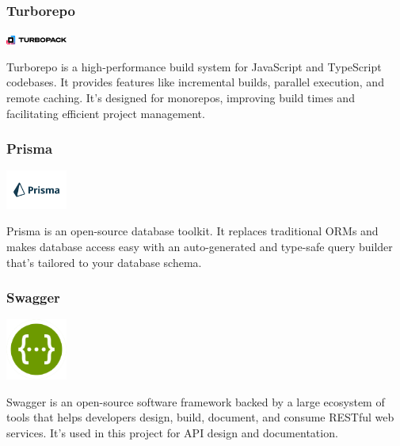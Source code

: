 \subsubsection*{Turborepo}

\begin{center}
\includegraphics[width=0.15\textwidth]{Images/logos/turbopack-logotype-light-background.png}
\label{fig:turborepo}
\end{center}
Turborepo is a high-performance build system for JavaScript and TypeScript codebases. It provides features like incremental builds, parallel execution, and remote caching. It’s designed for monorepos, improving build times and facilitating efficient project management.

\subsubsection*{Prisma}

\begin{center}
\includegraphics[width=0.15\textwidth]{Images/logos/Prisma.png}
\label{fig:prisma}
\end{center}
Prisma is an open-source database toolkit. It replaces traditional ORMs and makes database access easy with an auto-generated and type-safe query builder that’s tailored to your database schema.

\clearpage

\subsubsection*{Swagger}

\begin{center}
\includegraphics[width=0.15\textwidth]{Images/logos/Swagger-logo.png}
\label{fig:swagger}
\end{center}
Swagger is an open-source software framework backed by a large ecosystem of tools that helps developers design, build, document, and consume RESTful web services. It’s used in this project for API design and documentation.
